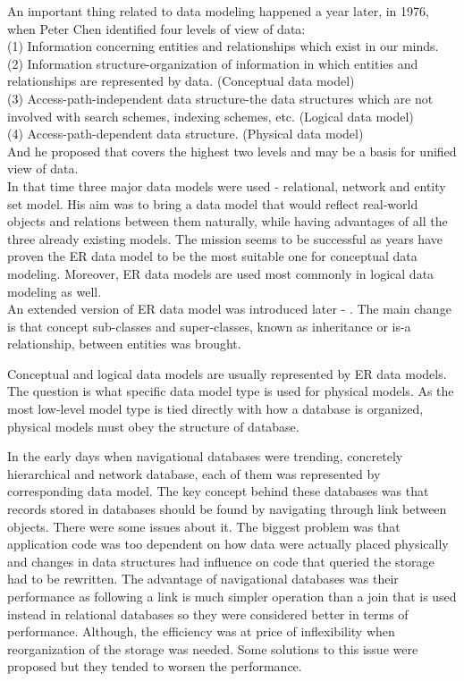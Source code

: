 An important thing related to data modeling happened a year later, in 1976, when Peter Chen identified four levels of view of data: \\
(1) Information concerning entities and relationships which exist in our minds. \\
(2) Information structure-organization of information in which entities and relationships are represented by data. (Conceptual data model) \\
(3) Access-path-independent data structure-the data structures which are not involved with search schemes, indexing schemes, etc. (Logical data model) \\
(4) Access-path-dependent data structure. (Physical data model)\\
And he proposed  that covers the highest two levels and may be a basis for unified view of data. \\
In that time three major data models were used - relational, network and entity set model. His aim was to bring a data model that would reflect real-world objects and relations between them naturally, while having advantages of all the three already existing models. The mission seems to be successful as years have proven the ER data model to be the most suitable one for conceptual data modeling. Moreover, ER data models are used most commonly in logical data modeling as well. \\
An extended version of ER data model was introduced later - . The main change is that concept sub-classes and super-classes, known as inheritance or is-a relationship, between entities was brought.

Conceptual and logical data models are usually represented by ER data models. The question is what specific data model type is used for physical models. 
As the most low-level model type is tied directly with how a database is organized, physical models must obey the structure of database.

In the early days when navigational databases were trending, concretely hierarchical and network database, each of them was represented by corresponding data model. 
The key concept behind these databases was that records stored in databases should be found by navigating through link between objects. 
There were some issues about it. The biggest problem was that application code was too dependent on how data were actually placed physically and changes in data structures had influence on code that queried the storage had to be rewritten.
The advantage of navigational databases was their performance as following a link is much simpler operation than a join that is used instead in relational databases so they were considered better in terms of performance. Although, the efficiency was at price of inflexibility when reorganization of the storage was needed. Some solutions to this issue were proposed but they tended to worsen the performance. \\


